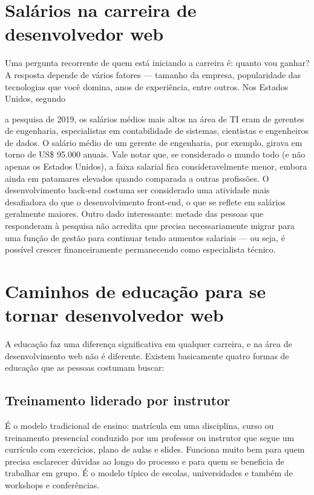\section{Salários na carreira de desenvolvedor web}

Uma pergunta recorrente de quem está iniciando a carreira é: quanto vou ganhar? A resposta depende de vários fatores — tamanho da empresa, popularidade das tecnologias que você domina, anos de experiência, entre outros. Nos Estados Unidos, segundo

a pesquisa de 2019, os salários médios mais altos na área de TI eram de gerentes de engenharia, especialistas em contabilidade de sistemas, cientistas e engenheiros de dados. O salário médio de um gerente de engenharia, por exemplo, girava em torno de US\$ 95.000 anuais. Vale notar que, se considerado o mundo todo (e não apenas os Estados Unidos), a faixa salarial fica consideravelmente menor, embora ainda em patamares elevados quando comparada a outras profissões. O desenvolvimento back-end costuma ser considerado uma atividade mais desafiadora do que o desenvolvimento front-end, o que se reflete em salários geralmente maiores. Outro dado interessante: metade das pessoas que responderam à pesquisa não acredita que precisa necessariamente migrar para uma função de gestão para continuar tendo aumentos salariais — ou seja, é possível crescer financeiramente permanecendo como especialista técnico.

\section{Caminhos de educação para se tornar desenvolvedor web}

A educação faz uma diferença significativa em qualquer carreira, e na área de desenvolvimento web não é diferente. Existem basicamente quatro formas de educação que as pessoas costumam buscar:

\subsection{Treinamento liderado por instrutor}

É o modelo tradicional de ensino: matrícula em uma disciplina, curso ou treinamento presencial conduzido por um professor ou instrutor que segue um currículo com exercícios, plano de aulas e slides. Funciona muito bem para quem precisa esclarecer dúvidas ao longo do processo e para quem se beneficia de trabalhar em grupo. É o modelo típico de escolas, universidades e também de workshops e conferências.

